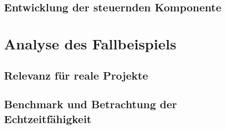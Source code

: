 \documentclass[
  a4paper,					    %
  twoside,
  DIV=calc,     				%
  bibliography=totoc,
  cleardoublepage=empty,
  ngerman,     					%
  final       					%
]{scrbook}
\begin{document}
\section{Entwicklung der steuernden Komponente}
\label{sec:entwicklung_vcan_app}






\chapter{Analyse des Fallbeispiels}
\label{sec:Beispiel_Analyse}




\section{Relevanz für reale Projekte}
\label{sec:Relevanz}
% 



% 
\section{Benchmark und Betrachtung der Echtzeitfähigkeit}
\label{sec:Benchmark}
%
%






\end{document}
